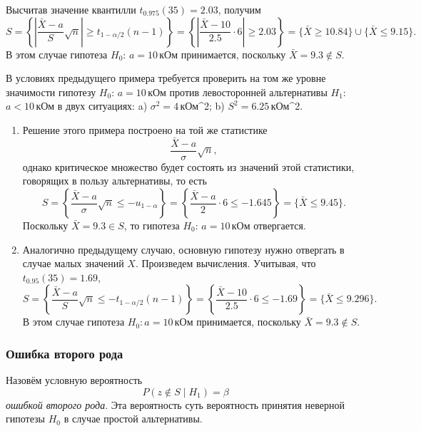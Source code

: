 \begin{ex}
\begin{solution}
\begin{enumerate}[label=\alph*)]
      Высчитав значение квантилли $ t_{0.975}(35) = 2.03 $, получим 
      \[
          S = \left\{ \left| \frac{\bar X - a}{S}\sqrt n \right| \geqslant
          t_{1-\alpha/2}(n-1) \right\} = \left\{ \left| \frac{\bar X - 10}{2.5}\cdot 6
          \right| \geqslant 2.03 \right\} = \{\bar X \geqslant 10.84\} \cup \{\bar X
          \leqslant 9.15\}.
      \]
      В этом случае гипотеза $ H_0 $: $ a = 10 $\,кОм принимается, поскольку $ \bar X
      = 9.3 \notin S$.
    \end{enumerate}

  \end{solution}
\end{ex}

\begin{ex}\label{ex:2}
	В условиях предыдущего примера требуется проверить на том же уровне значимости
	гипотезу $ H_0 $: $ a = 10 $\,кОм против левосторонней альтернативы $ H_1 $:
	$ a < 10 $\,кОм в двух ситуациях: a) $ \sigma^2 = 4 $\,кОм^2; b) $ S^2 = 6.25
	$\,кОм^2.
	\begin{solution}
		\begin{enumerate}[label=\alph*)]
			\item\label{enum:1} Решение этого примера  построено на той же статистике 
			\[
					\frac{\bar X - a}{\sigma}\sqrt n,
			\]
			однако критическое множество будет состоять из значений этой статистики,
			говорящих в пользу альтернативы, то есть 
			\[
				S = \left\{ \frac{\bar X - a}{\sigma}\sqrt n \leqslant - u_{1-\alpha}
				\right\} = \left\{ \frac{\bar X - a}{2} \cdot 6 \leqslant - 1.645
				\right\} = \{\bar X \leqslant 9.45 \}.
			\]
		Поскольку $ \bar X = 9.3 \in S $, то гипотеза $ H_0 $: $ a = 10 $\,кОм
		отвергается.	
	\item Аналогично предыдущему случаю, основную гипотезу нужно отвергать в случае малых 
		значений $X$. Произведем вычисления. Учитывая, что $ t_{0.95}(35) = 1.69 $,
	\[
		S = \left\{ \frac{\bar X - a}{S}\sqrt n \leqslant -t_{1-\alpha/2}(n-1)
		\right\} = \left\{ \frac{\bar X - 10}{2.5}\cdot 6 \leqslant -1.69 \right\} =
		\{\bar X \leqslant 9.296\}.
	\]
	В этом случае гипотеза $ H_0: a = 10 $\,кОм принимается, поскольку $ \bar X =
	9.3 \notin S$.
		\end{enumerate}

	\end{solution}
\end{ex}

\subsubsection{Ошибка второго рода}
\begin{definition}
Назовём условную вероятность
\[
	P(z\notin S \mid H_1) = \beta
\]
\emph{ошибкой второго рода}. Эта вероятность суть вероятность принятия неверной
гипотезы $ H_0 $ в случае простой альтернативы.
\end{definition}

